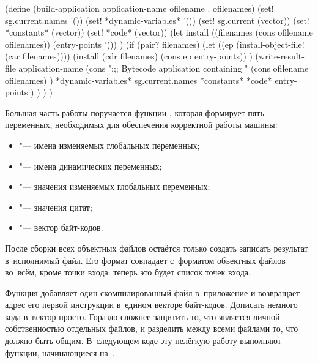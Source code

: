 \begin{code:lisp}
(define (build-application application-name ofilename . ofilenames)
  (set! sg.current.names    '())
  (set! *dynamic-variables* '())
  (set! sg.current          (vector))
  (set! *constants*         (vector))
  (set! *code*              (vector))
  (let install ((filenames (cons ofilename ofilenames))
                (entry-points '()) )
    (if (pair? filenames)
        (let ((ep (install-object-file! (car filenames))))
          (install (cdr filenames) (cons ep entry-points)) )
        (write-result-file application-name
                           (cons ";;; Bytecode application containing "
                                 (cons ofilename ofilenames) )
                           *dynamic-variables*
                           sg.current.names
                           *constants*
                           *code*
                           entry-points ) ) ) )
\end{code:lisp}

Большая часть работы поручается функции , которая
формирует пять переменных, необходимых для обеспечения корректной работы машины:

\begin{itemize}
  \item {} "--- имена изменяемых глобальных переменных;

  \item {} "--- имена динамических переменных;

  \item {} "--- значения изменяемых глобальных переменных;

  \item {} "--- значения цитат;

  \item {} "--- вектор байт-кодов.
\end{itemize}

\noindent
После сборки всех объектных файлов остаётся только создать записать результат
в~исполнимый файл. Его формат совпадает с~форматом объектных файлов во~всём,
кроме точки входа: теперь это будет список точек входа.

Функция  добавляет один скомпилированный файл
в~приложение и возвращает адрес его первой инструкции в~едином векторе
байт-кодов. Дописать немного кода в~вектор  просто. Гораздо сложнее
защитить то, что является личной собственностью отдельных файлов, и разделить
между всеми файлами то, что должно быть общим. В~следующем коде эту нелёгкую
работу выполняют функции, начинающиеся на~.

